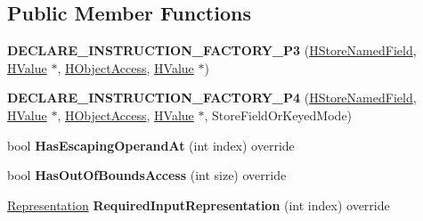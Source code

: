 \subsection*{Public Member Functions}
\begin{DoxyCompactItemize}
\item 
{\bfseries D\+E\+C\+L\+A\+R\+E\+\_\+\+I\+N\+S\+T\+R\+U\+C\+T\+I\+O\+N\+\_\+\+F\+A\+C\+T\+O\+R\+Y\+\_\+\+P3} (\hyperlink{classv8_1_1internal_1_1_h_store_named_field}{H\+Store\+Named\+Field}, \hyperlink{classv8_1_1internal_1_1_h_value}{H\+Value} $\ast$, \hyperlink{classv8_1_1internal_1_1_h_object_access}{H\+Object\+Access}, \hyperlink{classv8_1_1internal_1_1_h_value}{H\+Value} $\ast$)\hypertarget{classv8_1_1internal_1_1_h_store_named_field_a2b2c47d1830e8d6db9dd912c25961b78}{}\label{classv8_1_1internal_1_1_h_store_named_field_a2b2c47d1830e8d6db9dd912c25961b78}

\item 
{\bfseries D\+E\+C\+L\+A\+R\+E\+\_\+\+I\+N\+S\+T\+R\+U\+C\+T\+I\+O\+N\+\_\+\+F\+A\+C\+T\+O\+R\+Y\+\_\+\+P4} (\hyperlink{classv8_1_1internal_1_1_h_store_named_field}{H\+Store\+Named\+Field}, \hyperlink{classv8_1_1internal_1_1_h_value}{H\+Value} $\ast$, \hyperlink{classv8_1_1internal_1_1_h_object_access}{H\+Object\+Access}, \hyperlink{classv8_1_1internal_1_1_h_value}{H\+Value} $\ast$, Store\+Field\+Or\+Keyed\+Mode)\hypertarget{classv8_1_1internal_1_1_h_store_named_field_af3596c88942d765381657cc68ba5969d}{}\label{classv8_1_1internal_1_1_h_store_named_field_af3596c88942d765381657cc68ba5969d}

\item 
bool {\bfseries Has\+Escaping\+Operand\+At} (int index) override\hypertarget{classv8_1_1internal_1_1_h_store_named_field_a5d3937a4017c5d331411a1a877fa4434}{}\label{classv8_1_1internal_1_1_h_store_named_field_a5d3937a4017c5d331411a1a877fa4434}

\item 
bool {\bfseries Has\+Out\+Of\+Bounds\+Access} (int size) override\hypertarget{classv8_1_1internal_1_1_h_store_named_field_ad165ad4265823400f5b479f1b7ca04ba}{}\label{classv8_1_1internal_1_1_h_store_named_field_ad165ad4265823400f5b479f1b7ca04ba}

\item 
\hyperlink{classv8_1_1internal_1_1_representation}{Representation} {\bfseries Required\+Input\+Representation} (int index) override\hypertarget{classv8_1_1internal_1_1_h_store_named_field_a930f90658fc5cbe474bb19671ff63fe2}{}\label{classv8_1_1internal_1_1_h_store_named_field_a930f90658fc5cbe474bb19671ff63fe2}


\end{DoxyCompactItemize}
